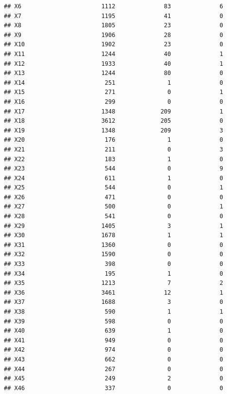 \documentclass[10pt,handout,english]{beamer}\usepackage[]{graphicx}\usepackage[]{color}
\makeatletter
\newenvironment{kframe}{%
 \def\at@end@of@kframe{}%
 \ifinner\ifhmode%
  \def\at@end@of@kframe{\end{minipage}}%
  \begin{minipage}{\columnwidth}%
 \fi\fi%
 \def\FrameCommand##1{\hskip\@totalleftmargin \hskip-\fboxsep
 \colorbox{shadecolor}{##1}\hskip-\fboxsep
     \hskip-\linewidth \hskip-\@totalleftmargin \hskip\columnwidth}%
 \MakeFramed {\advance\hsize-\width
   \@totalleftmargin\z@ \linewidth\hsize
   \@setminipage}}%
 {\par\unskip\endMakeFramed%
 \at@end@of@kframe}
\newenvironment{knitrout}{}{} %
\makeatother
\begin{document}
\begin{frame}[fragile]
\begin{knitrout}
\begin{kframe}
\begin{verbatim}
## X6                       1112              83              6
## X7                       1195              41              0
## X8                       1805              23              0
## X9                       1906              28              0
## X10                      1902              23              0
## X11                      1244              40              1
## X12                      1933              40              1
## X13                      1244              80              0
## X14                       251               1              0
## X15                       271               0              1
## X16                       299               0              0
## X17                      1348             209              1
## X18                      3612             205              0
## X19                      1348             209              3
## X20                       176               1              0
## X21                       211               0              3
## X22                       183               1              0
## X23                       544               0              9
## X24                       611               1              0
## X25                       544               0              1
## X26                       471               0              0
## X27                       500               0              1
## X28                       541               0              0
## X29                      1405               3              1
## X30                      1678               1              1
## X31                      1360               0              0
## X32                      1590               0              0
## X33                       398               0              0
## X34                       195               1              0
## X35                      1213               7              2
## X36                      3461              12              1
## X37                      1688               3              0
## X38                       590               1              1
## X39                       598               0              0
## X40                       639               1              0
## X41                       949               0              0
## X42                       974               0              0
## X43                       662               0              0
## X44                       267               0              0
## X45                       249               2              0
## X46                       337               0              0

\end{verbatim}
\end{kframe}
\end{knitrout}
\end{frame}
\end{document}
